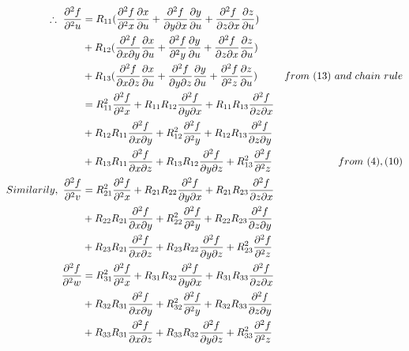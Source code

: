 \documentclass[a4paper,fleqn,11pt]{article}
\theoremstyle{mytheor}
\begin{document}
\begin{align}
\therefore\ \frac{\partial^2 f}{\partial^2 u} & =
R_{11}
(\frac{\partial^2 f}{\partial^2 x} \frac{\partial x}{\partial u} +
 \frac{\partial^2 f}{\partial y \partial x} \frac{\partial y}{\partial u} +
 \frac{\partial^2 f}{\partial z \partial x} \frac{\partial z}{\partial u})\notag \\
& + R_{12}(\frac{\partial^2 f}{\partial x \partial y} \frac{\partial x}{\partial u}
  + \frac{\partial^2 f}{\partial^2 y} \frac{\partial y}{\partial u}
  +	 \frac{\partial^2 f}{\partial z \partial x} \frac{\partial z}{\partial u}) \notag \\
& + R_{13}(\frac{\partial^2 f}{\partial x \partial z} \frac{\partial x}{\partial u}
  + \frac{\partial^2 f}{\partial y \partial z} \frac{\partial y}{\partial u} 
  +	 \frac{\partial^2 f}{\partial^2 z} \frac{\partial z}{\partial u}) & from\ (13)\ and\ chain\ rule \\
& = R_{11}^2\frac{\partial^2 f}{\partial^2 x} +
	R_{11}R_{12}\frac{\partial^2 f}{\partial y \partial x} +
	R_{11}R_{13}\frac{\partial^2 f}{\partial z \partial x}\notag \\
& + R_{12}R_{11}\frac{\partial^2 f}{\partial x \partial y} +
	R_{12}^2\frac{\partial^2 f}{\partial^2 y} +
	R_{12}R_{13}\frac{\partial^2 f}{\partial z \partial y}\notag \\
& + R_{13}R_{11}\frac{\partial^2 f}{\partial x \partial z} +
	R_{13}R_{12}\frac{\partial^2 f}{\partial y \partial z} +
	R_{13}^2\frac{\partial^2 f}{\partial^2 z} & from\ (4), (10) \\
Similarily,\ \frac{\partial^2 f}{\partial^2 v} & =
	R_{21}^2\frac{\partial^2 f}{\partial^2 x} +
	R_{21}R_{22}\frac{\partial^2 f}{\partial y \partial x} +
	R_{21}R_{23}\frac{\partial^2 f}{\partial z \partial x}\notag \\
& + R_{22}R_{21}\frac{\partial^2 f}{\partial x \partial y} +
	R_{22}^2\frac{\partial^2 f}{\partial^2 y} +
	R_{22}R_{23}\frac{\partial^2 f}{\partial z \partial y}\notag \\
& + R_{23}R_{21}\frac{\partial^2 f}{\partial x \partial z} +
	R_{23}R_{22}\frac{\partial^2 f}{\partial y \partial z} +
	R_{23}^2\frac{\partial^2 f}{\partial^2 z} \\
\frac{\partial^2 f}{\partial^2 w} & =
	R_{31}^2\frac{\partial^2 f}{\partial^2 x} +
	R_{31}R_{32}\frac{\partial^2 f}{\partial y \partial x} +
	R_{31}R_{33}\frac{\partial^2 f}{\partial z \partial x}\notag \\
& + R_{32}R_{31}\frac{\partial^2 f}{\partial x \partial y} +
	R_{32}^2\frac{\partial^2 f}{\partial^2 y} +
	R_{32}R_{33}\frac{\partial^2 f}{\partial z \partial y}\notag \\
& + R_{33}R_{31}\frac{\partial^2 f}{\partial x \partial z} +
	R_{33}R_{32}\frac{\partial^2 f}{\partial y \partial z} +
	R_{33}^2\frac{\partial^2 f}{\partial^2 z}
\end{align}
\end{document}
